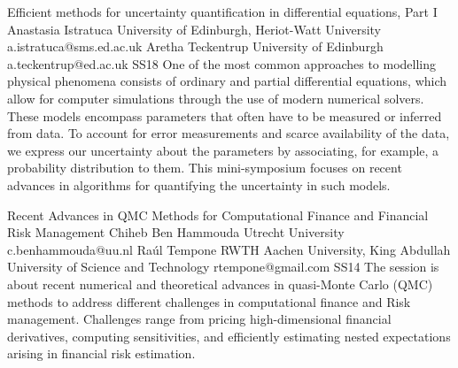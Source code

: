 \documentclass[12pt,a4paper,figuresright]{book}
\begin{document}



\clearpage

\begin{session}
 {Efficient methods for uncertainty quantification in differential equations, Part I}%
 {Anastasia Istratuca}%
 {University of Edinburgh, Heriot-Watt University}%
 {a.istratuca@sms.ed.ac.uk}%
 {Aretha Teckentrup}%
 {University of Edinburgh}%
 {a.teckentrup@ed.ac.uk}%
 {SS18}%
 {}%
 One of the most common approaches to modelling physical phenomena consists of ordinary and partial differential equations, which allow for computer simulations through the use of modern numerical solvers. These models encompass parameters that often have to be measured or inferred from data. To account for error measurements and scarce availability of the data, we express our uncertainty about the parameters by associating, for example, a probability distribution to them. This mini-symposium focuses on recent advances in algorithms for quantifying the uncertainty in such models.
\end{session}



%



\clearpage



\begin{session}
 {Recent Advances in QMC Methods for Computational Finance and Financial Risk Management}%
 {Chiheb Ben Hammouda}%
 {Utrecht University}%
 {c.benhammouda@uu.nl}%
 {Ra\'{u}l Tempone}%
 {RWTH Aachen University, King Abdullah University of Science and Technology}%
 {rtempone@gmail.com}%
 {SS14}%
 {}%
 The session is about recent numerical and theoretical advances in quasi-Monte Carlo (QMC) methods to address different challenges in computational finance and Risk management. Challenges range from pricing high-dimensional financial derivatives, computing sensitivities, and efficiently estimating nested expectations arising in financial risk estimation.
\end{session}
\end{document}

